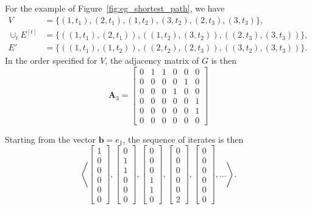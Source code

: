 \documentclass[10pt,conference,compsocconf]{IEEEtran}
\theoremstyle{definition}
\begin{document}
For the example of Figure~\ref{fig:eg_shortest_path}, we have
\begin{align*}
V & = \{(1,\!t_1), (2,\!t_1), (1,\!t_2), (3,\!t_2), (2,\!t_3), (3,\!t_3)\},\\
\cup_t\!E^{[t]} &= \{((1,\!t_1), (2,\!t_1)), ((1,\!t_2), (3,\!t_2)), ((2,\!t_3), (3,\!t_3))\},\\
E'  &= \{((1,\!t_1), (1,\!t_2)), ((2,\!t_2), (2,\!t_3)), ((3,\!t_2), (3,\!t_3))\}.
\end{align*}
In the order specified for $V$, the adjacency matrix of $G$ is then
\[
\bm A_3 = \begin{bmatrix}
0 & 1 & 1 & 0 & 0 & 0 \\
0 & 0 & 0 & 0 & 1 & 0 \\
0 & 0 & 0 & 1 & 0 & 0 \\
0 & 0 & 0 & 0 & 0 & 1 \\
0 & 0 & 0 & 0 & 0 & 1 \\
0 & 0 & 0 & 0 & 0 & 0
\end{bmatrix}
\]

Starting from the vector $\bm b = e_1$, the sequence of iterates is then
\[
\left\langle
\begin{bmatrix}1 \\ 0 \\ 0 \\ 0 \\ 0 \\ 0 \end{bmatrix},
\begin{bmatrix}0 \\ 1 \\ 1 \\ 0 \\ 0 \\ 0 \end{bmatrix},
\begin{bmatrix}0 \\ 0 \\ 0 \\ 1 \\ 1 \\ 0 \end{bmatrix},
\begin{bmatrix}0 \\ 0 \\ 0 \\ 0 \\ 0 \\ 2 \end{bmatrix},
\begin{bmatrix}0 \\ 0 \\ 0 \\ 0 \\ 0 \\ 0 \end{bmatrix},
\dots
\right\rangle.
\]
\end{document}
